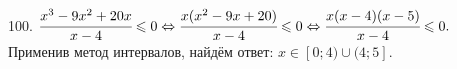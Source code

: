 100. $\cfrac{x^3-9x^2+20x}{x-4}\leqslant0\Leftrightarrow \cfrac{x(x^2-9x+20)}{x-4}\leqslant0\Leftrightarrow\cfrac{x(x-4)(x-5)}{x-4}\leqslant0.$ Применив метод интервалов, найдём ответ: $x\in[0;4)\cup(4;5].$
\begin{figure}[ht!]
\end{figure}\\
